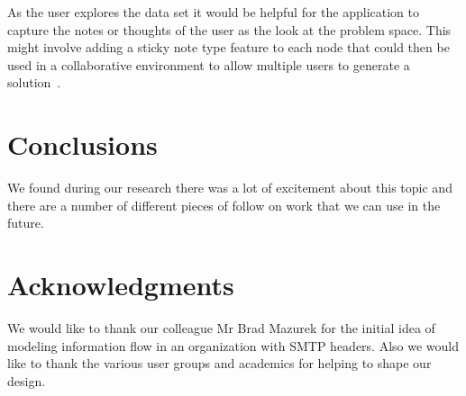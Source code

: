 \documentclass[journal]{vgtc}                %
\begin{document}
As the user explores the data set it would be helpful for the application to capture the notes or thoughts of the user as the look at the problem space.  This might involve adding a sticky note type feature to each node that could then be used in a collaborative environment to allow multiple users to generate a solution~\cite{ware2012information}.

\section{Conclusions}
\label{sec:conclusions}

We found during our research there was a lot of excitement about this topic and there are a number of different pieces of follow on work that we can use in the future.

\section{Acknowledgments}
We would like to thank our colleague Mr Brad Mazurek for the initial idea of modeling information flow in an organization with SMTP headers.  Also we would like to thank the various user groups and academics for helping to shape our design.



\end{document}
